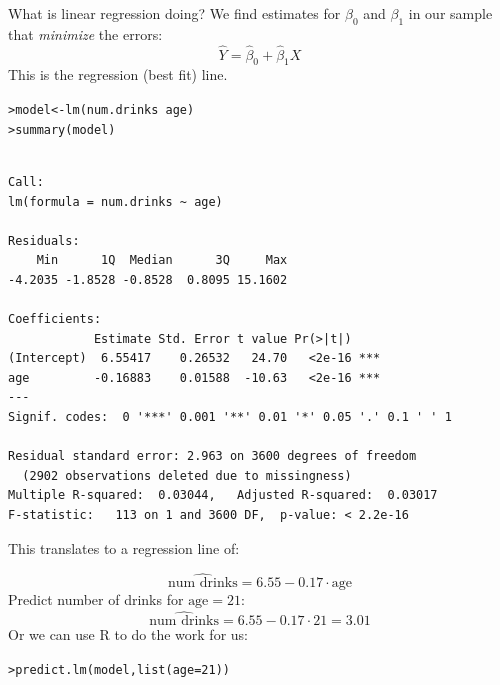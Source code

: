 \documentclass{beamer}\usepackage[]{graphicx}\usepackage[]{color}
\makeatletter
\newcommand{\hlnum}[1]{\textcolor[rgb]{0.824,0.412,0.118}{#1}}%
\newcommand{\hlopt}[1]{\textcolor[rgb]{1,0.894,0.769}{#1}}%
\newcommand{\hlstd}[1]{\textcolor[rgb]{1,0.894,0.769}{#1}}%
\newcommand{\hlkwb}[1]{\textcolor[rgb]{0.804,0.776,0.451}{#1}}%
\newcommand{\hlkwc}[1]{\textcolor[rgb]{0.78,0.941,0.545}{#1}}%
\newcommand{\hlkwd}[1]{\textcolor[rgb]{1,0.78,0.769}{#1}}%
\newenvironment{kframe}{%
 \def\at@end@of@kframe{}%
 \ifinner\ifhmode%
  \def\at@end@of@kframe{\end{minipage}}%
  \begin{minipage}{\columnwidth}%
 \fi\fi%
 \def\FrameCommand##1{\hskip\@totalleftmargin \hskip-\fboxsep
 \colorbox{shadecolor}{##1}\hskip-\fboxsep
     \hskip-\linewidth \hskip-\@totalleftmargin \hskip\columnwidth}%
 \MakeFramed {\advance\hsize-\width
   \@totalleftmargin\z@ \linewidth\hsize
   \@setminipage}}%
 {\par\unskip\endMakeFramed%
 \at@end@of@kframe}
\newenvironment{knitrout}{}{} %
\makeatother
\begin{document}
\begin{darkframes}
\begin{frame}{What is linear regression doing?}
      We find estimates for $\beta_0$ and $\beta_1$ in our sample that \emph{minimize} the errors:
      \[
        \hat Y = \hat\beta_0 + \hat\beta_1 X
      \]
      This is the regression (best fit) line.
    \end{frame}

    \begin{frame}[fragile]
      \fontsize{9}{9}\selectfont
\begin{knitrout}
\begin{kframe}
\begin{alltt}
\hlstd{> }\hlstd{model} \hlkwb{<-} \hlkwd{lm}\hlstd{(num.drinks} \hlopt{~} \hlstd{age)}
\hlstd{> }\hlkwd{summary}\hlstd{(model)}
\end{alltt}
\begin{verbatim}

Call:
lm(formula = num.drinks ~ age)

Residuals:
    Min      1Q  Median      3Q     Max 
-4.2035 -1.8528 -0.8528  0.8095 15.1602 

Coefficients:
            Estimate Std. Error t value Pr(>|t|)    
(Intercept)  6.55417    0.26532   24.70   <2e-16 ***
age         -0.16883    0.01588  -10.63   <2e-16 ***
---
Signif. codes:  0 '***' 0.001 '**' 0.01 '*' 0.05 '.' 0.1 ' ' 1

Residual standard error: 2.963 on 3600 degrees of freedom
  (2902 observations deleted due to missingness)
Multiple R-squared:  0.03044,	Adjusted R-squared:  0.03017 
F-statistic:   113 on 1 and 3600 DF,  p-value: < 2.2e-16
\end{verbatim}
\end{kframe}
\end{knitrout}
      \lc
    \end{frame}

    \begin{frame}[fragile]
      This translates to a regression line of:

      \[
        \widehat{\text{num drinks}} = 6.55 - 0.17 \cdot\text{age}
      \]
      \pause
      Predict number of drinks for $\text{age}=21$:
      \[
        \widehat{\text{num drinks}} 
        = 6.55 - 0.17 \cdot 21
        = 3.01
      \]
      Or we can use R to do the work for us:
\begin{knitrout}
\begin{kframe}
\begin{alltt}
\hlstd{> }\hlkwd{predict.lm}\hlstd{(model,} \hlkwd{list}\hlstd{(}\hlkwc{age}\hlstd{=}\hlnum{21}\hlstd{))}
\end{alltt}
\end{kframe}
\end{knitrout}
      \lc
    \end{frame}


\end{darkframes}
\end{document}
